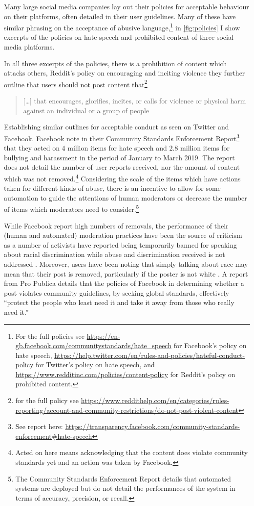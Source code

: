 Many large social media companies lay out their policies for acceptable behaviour on their platforms, often detailed in their user guidelines. Many of these have similar phrasing on the acceptance of abusive language,\footnote{For the full policies see \url{https://en-gb.facebook.com/communitystandards/hate_speech} for Facebook's policy on hate speech, \url{https://help.twitter.com/en/rules-and-policies/hateful-conduct-policy} for Twitter's policy on hate speech, and \url{https://www.redditinc.com/policies/content-policy} for Reddit's policy on prohibited content.} in \autoref{fig:policies} I show excerpts of the policies on hate speech and prohibited content of three social media platforms.

In all three excerpts of the policies, there is a prohibition of content which attacks others, Reddit's policy on encouraging and inciting violence they further outline that users should not post content that\footnote{for the full policy see \url{https://www.reddithelp.com/en/categories/rules-reporting/account-and-community-restrictions/do-not-post-violent-content}}

\begin{quote}
  [\dots] that encourages, glorifies, incites, or calls for violence or physical harm against an individual or a group of people
\end{quote}

Establishing similar outlines for acceptable conduct as seen on Twitter and Facebook. Facebook note in their Community Standards Enforcement Report\footnote{See report here: \url{https://transparency.facebook.com/community-standards-enforcement\#hate-speech}} that they acted on $4$ million items for hate speech and $2.8$ million items for bullying and harassment in the period of January to March 2019. The report does not detail the number of user reports received, nor the amount of content which was not removed.\footnote{Acted on here means acknowledging that the content does violate community standards yet and an action was taken by Facebook.} Considering the scale of the items which have actions taken for different kinds of abuse, there is an incentive to allow for some automation to guide the attentions of human moderators or decrease the number of items which moderators need to consider.\footnote{The Community Standards Enforcement Report details that automated systems are deployed but do not detail the performances of the system in terms of accuracy, precision, or recall.}

While Facebook report high numbers of removals, the performance of their (human and automated) moderation practices have been the source of criticism as a number of activists have reported being temporarily banned for speaking about racial discrimination while abuse and discrimination received is not addressed \citep{Sharif:2019}.
Moreover, users have been noting that simply talking about race may mean that their post is removed, particularly if the poster is not white \citep{Guynn:2019}. A report from Pro Publica details that the policies of Facebook in determining whether a post violates community guidelines, by seeking global standards, effectively ``protect the people who least need it and take it away from those who really need it.''\citep{Angwin:2017}

